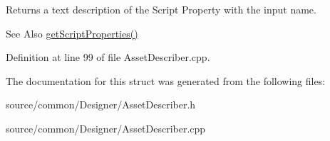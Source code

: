 Returns a text description of the Script Property with the input name. 

\begin{DoxySeeAlso}{See Also}
\hyperlink{struct_asset_description_a946b6d3957d5de50c98f625752824478}{get\-Script\-Properties()} 
\end{DoxySeeAlso}


Definition at line 99 of file Asset\-Describer.\-cpp.



The documentation for this struct was generated from the following files\-:\begin{DoxyCompactItemize}
\item 
source/common/\-Designer/Asset\-Describer.\-h\item 
source/common/\-Designer/Asset\-Describer.\-cpp\end{DoxyCompactItemize}
